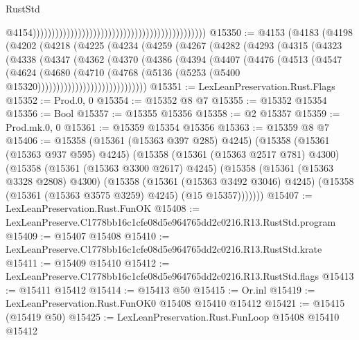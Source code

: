 \begin{lexlean}{RustStd}
\begin{coremodule}
                                                                                                @4154))))))))))))))))))))))))))))))))))))))))))))))
@15350 := @4153
    (@4183
      (@4198
        (@4202
          (@4218
            (@4225
              (@4234
                (@4259
                  (@4267
                    (@4282
                      (@4293
                        (@4315
                          (@4323
                            (@4338
                              (@4347
                                (@4362
                                  (@4370
                                    (@4386
                                      (@4394
                                        (@4407
                                          (@4476
                                            (@4513
                                              (@4547
                                                (@4624
                                                  (@4680
                                                    (@4710
                                                      (@4768
                                                        (@5136
                                                          (@5253
                                                            (@5400
                                                              @15320)))))))))))))))))))))))))))))
@15351 := LexLeanPreservation.Rust.Flags
@15352 := Prod.{0, 0}
@15354 := @15352 @8 @7
@15355 := @15352 @15354
@15356 := Bool
@15357 := @15355 @15356
@15358 := @2 @15357
@15359 := Prod.mk.{0, 0}
@15361 := @15359 @15354 @15356
@15363 := @15359 @8 @7
@15406 := @15358
    (@15361 (@15363 @397 @285) @4245)
    (@15358
      (@15361 (@15363 @937 @595) @4245)
      (@15358
        (@15361 (@15363 @2517 @781) @4300)
        (@15358
          (@15361 (@15363 @3300 @2617) @4245)
          (@15358
            (@15361 (@15363 @3328 @2808) @4300)
            (@15358
              (@15361 (@15363 @3492 @3046) @4245)
              (@15358 (@15361 (@15363 @3575 @3259) @4245) (@15 @15357)))))))
@15407 := LexLeanPreservation.Rust.FunOK
@15408 := LexLeanPreserve.C1778bb16c1cfe08d5e964765dd2c0216.R13.RustStd.program
@15409 := @15407 @15408
@15410 := LexLeanPreserve.C1778bb16c1cfe08d5e964765dd2c0216.R13.RustStd.krate
@15411 := @15409 @15410
@15412 := LexLeanPreserve.C1778bb16c1cfe08d5e964765dd2c0216.R13.RustStd.flags
@15413 := @15411 @15412
@15414 := @15413 @50
@15415 := Or.inl
@15419 := LexLeanPreservation.Rust.FunOK0 @15408 @15410 @15412
@15421 := @15415 (@15419 @50)
@15425 := LexLeanPreservation.Rust.FunLoop @15408 @15410 @15412

\end{coremodule}
\end{lexlean}
